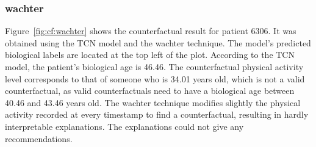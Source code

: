 \subsubsection{\gls{wachter}}
Figure~\ref{fig:cf:wachter} shows the counterfactual result for patient 6306. It was obtained using the TCN model and the \gls{wachter} technique. The model's predicted biological labels are located at the top left of the plot. According to the TCN model, the patient's biological age is 46.46.
The counterfactual physical activity level corresponds to that of someone who is 34.01 years old, which is not a valid counterfactual, as valid counterfactuals need to have a biological age between 40.46 and 43.46 years old. The \gls{wachter} technique modifies slightly the physical activity recorded at every timestamp to find a counterfactual, resulting in hardly interpretable explanations. The explanations could not give any recommendations.

